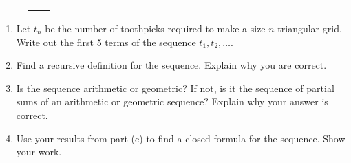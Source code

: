 \documentclass[10pt,]{book}
\theoremstyle{plain}
\theoremstyle{definition}
\numberwithin{equation}{chapter}
\newlength{\panelmax}
\begin{document}
\begin{exerciselist}
{\begin{figure}
\hspace*{0.14\textwidth}%
\begin{tabular}{@{}*{2}{c}@{}}
\begin{minipage}[c][\panelmax][b]{0.16\textwidth}\usebox{\panelboxLimage}\end{minipage}&
\begin{minipage}[c][\panelmax][b]{0.28\textwidth}\usebox{\panelboxMimage}\end{minipage}\end{tabular}
\end{figure}
}%
\leavevmode%
\begin{enumerate}[label=(\alph*)]
\item\hypertarget{li-536}{}
                  Let \(t_n\) be the number of toothpicks required to make a size \(n\) triangular grid. Write out the first 5 terms of the sequence \(t_1, t_2, \ldots\).


\item\hypertarget{li-537}{}
                  Find a recursive definition for the sequence. Explain why you are correct.


\item\hypertarget{li-538}{}
                  Is the sequence arithmetic or geometric? If not, is it the sequence of partial sums of an arithmetic or geometric sequence? Explain why your answer is correct.



\item\hypertarget{li-539}{}
                  Use your results from part (c) to find a closed formula for the sequence. Show your work.



\end{enumerate}
\end{exerciselist}
\end{document}
